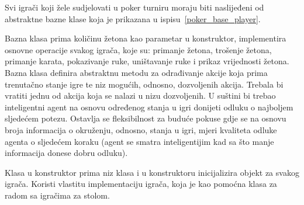 
Svi igrači koji žele sudjelovati u poker turniru moraju biti naslijeđeni od abstraktne bazne klase  koja je prikazana u ispisu~\ref{poker_base_player}. 


Bazna klasa prima količinu žetona kao parametar u konstruktor, implementira osnovne operacije svakog igrača, koje su: primanje žetona, trošenje žetona, primanje karata, pokazivanje ruke, uništavanje ruke i prikaz vrijednosti žetona. Bazna klasa definira abstraktnu metodu  za odrađivanje akcije koja prima trenutačno stanje igre te niz mogućih, odnosno, dozvoljenih akcija. Trebala bi vratiti jednu od akcija koja se nalazi u nizu dozvoljenih. U suštini bi trebao inteligentni agent na osnovu određenog stanja u igri donijeti odluku o najboljem sljedećem potezu. Ostavlja se fleksibilnost za buduće pokuse gdje se na osnovu broja informacija o okruženju, odnosno, stanja u igri, mjeri kvaliteta odluke agenta o sljedećem koraku (agent se smatra inteligentijim kad sa što manje informacija donese dobru odluku). 


Klasa  u konstruktor prima niz klasa  i u konstruktoru inicijalizira objekt za svakog igrača. Koristi vlastitu implementaciju igrača, koja je kao pomoćna klasa za radom sa igračima za stolom. 



